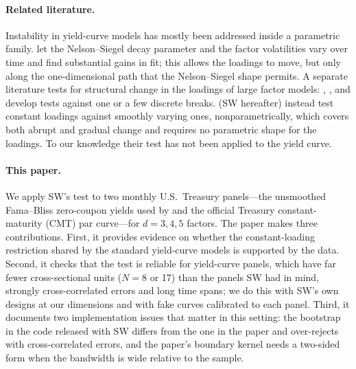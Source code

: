 \documentclass[11pt]{article}
\begin{document}
\paragraph{Related literature.} Instability in yield-curve models has mostly been addressed inside a parametric family. \citet{KMV2010} let the Nelson--Siegel decay parameter and the factor volatilities vary over time and find substantial gains in fit; this allows the loadings to move, but only along the one-dimensional path that the Nelson--Siegel shape permits. A separate literature tests for structural change in the loadings of large factor models: \citet{BreitungEickmeier2011}, \citet{CDG2014}, \citet{HanInoue2015} and \citet{YamamotoTanaka2015} develop tests against one or a few discrete breaks. \citet{SuWang2017} (SW hereafter) instead test constant loadings against smoothly varying ones, nonparametrically, which covers both abrupt and gradual change and requires no parametric shape for the loadings. To our knowledge their test has not been applied to the yield curve.

\paragraph{This paper.} We apply SW's test to two monthly U.S.\ Treasury panels---the unsmoothed Fama--Bliss zero-coupon yields used by \citet{JKV2014} and the official Treasury constant-maturity (CMT) par curve---for $d=3,4,5$ factors. The paper makes three contributions. First, it provides evidence on whether the constant-loading restriction shared by the standard yield-curve models is supported by the data. Second, it checks that the test is reliable for yield-curve panels, which have far fewer cross-sectional units ($N=8$ or 17) than the panels SW had in mind, strongly cross-correlated errors and long time spans; we do this with SW's own designs at our dimensions and with fake curves calibrated to each panel. Third, it documents two implementation issues that matter in this setting: the bootstrap in the code released with SW differs from the one in the paper and over-rejects with cross-correlated errors, and the paper's boundary kernel needs a two-sided form when the bandwidth is wide relative to the sample.
\end{document}
